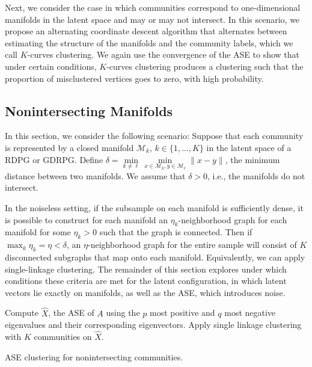 \documentclass[12pt]{article}
\begin{document}
Next, we consider the case in which communities correspond to
one-dimensional manifolds in the latent space and may or may not
intersect. In this scenario, we propose an alternating coordinate
descent algorithm that alternates between estimating the structure of
the manifolds and the community labels, which we call \(K\)-curves
clustering. We again use the convergence of the ASE to show that under
certain conditions, \(K\)-curves clustering produces a clustering such
that the proportion of misclustered vertices goes to zero, with high
probability.

\hypertarget{nonintersecting-manifolds}{%
\subsection{Nonintersecting Manifolds}\label{nonintersecting-manifolds}}

\label{section:nonintersecting}

In this section, we consider the following scenario: Suppose that each
community is represented by a closed manifold \(\mathcal{M}_k\),
\(k \in \{1, ..., K\}\) in the latent space of a RDPG or GDRPG. Define
\(\delta = \min\limits_{k \neq \ell} \min\limits_{x \in \mathcal{M}_k, y \in \mathcal{M}_\ell} \|x - y\|\),
the minimum distance between two manifolds. We assume that
\(\delta > 0\), i.e., the manifolds do not intersect.

In the noiseless setting, if the subsample on each manifold is
sufficiently dense, it is possible to construct for each manifold an
\(\eta_k\)-neighborhood graph for each manifold for some \(\eta_k > 0\)
such that the graph is connected. Then if
\(\max_k \eta_k = \eta < \delta\), an \(\eta\)-neighborhood graph for
the entire sample will consist of \(K\) disconnected subgraphs that map
onto each manifold. Equivalently, we can apply single-linkage
clustering. The remainder of this section explores under which
conditions these criteria are met for the latent configuration, in which
latent vectors lie exactly on manifolds, as well as the ASE, which
introduces noise.

\begin{algorithm}[h]
\DontPrintSemicolon
\SetAlgoLined
{}
Compute $\hat{X}$, the ASE of $A$ using the $p$ most positive and $q$ most negative eigenvalues and their corresponding eigenvectors.\;
Apply single linkage clustering with $K$ communities on $\hat{X}$.\;
\caption{ASE clustering for nonintersecting communities.}
\end{algorithm}
\end{document}
